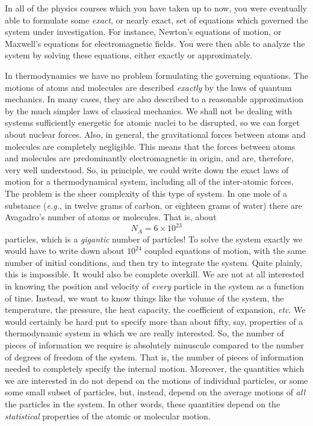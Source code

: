  In all of the physics
courses which you have taken up to now, you were eventually
able to formulate some
{\em exact}, or nearly exact, set of equations
 which governed the system under
investigation. For instance, Newton's equations of 
motion, or Maxwell's equations for electromagnetic fields.
You were then  able to analyze
the system by solving 
 these equations, either exactly or approximately. 

In thermodynamics we have no problem formulating the governing
equations. The motions of atoms and molecules are described {\em exactly}
 by the
laws of quantum mechanics. In many cases,  they are also described to a
reasonable  approximation by the much simpler
laws of classical mechanics. We shall not be
dealing with systems sufficiently energetic for  atomic nuclei to be
disrupted, so we can forget about nuclear forces. Also, in general, 
the gravitational forces between  atoms and molecules are completely
negligible. This means that the forces between atoms and molecules are
predominantly electromagnetic in origin,  and
are, therefore, very well understood.  So, in principle, we could write down
the exact laws of motion for a thermodynamical system, including all of
the inter-atomic
forces. The problem is the sheer complexity of this type of
 system. In one mole of
a substance ({\em e.g.},  in twelve grams of carbon, or eighteen grams
of water) there are 
Avagadro's number of atoms or molecules. That is, about
$$
N_A = 6 \times 10^{23}
$$
particles, which is a {\em gigantic}
 number of particles! To solve the system exactly we would
have to write down about $10^{24}$ coupled
equations of motion, with the same number
of initial conditions, and then try to integrate the system. 
Quite plainly,
 this is impossible. It would also be complete overkill. We are not
at  all 
interested in knowing the position and velocity of {\em every}\/ particle in the
system as a function of time.
 Instead, we want to know things like the volume of the system, the
temperature, the pressure, the heat capacity, the coefficient of expansion,
{\em etc}. We would certainly be hard put to specify more than about fifty,
say, properties of  a thermodynamic system in which we are  really interested. 
So, the number of pieces of information we require  
 is absolutely
minuscule compared to the number of degrees of freedom of the system.
 That is,
the number of pieces of information needed to completely specify the 
internal motion.
Moreover, the quantities which we are interested in do not depend on the
motions of individual particles, or some some small subset of  particles,
 but, instead, depend on the average motions of {\em all}
 the particles in the system.
In other words, these quantities depend on the {\em statistical}
 properties of the atomic or molecular motion. 

